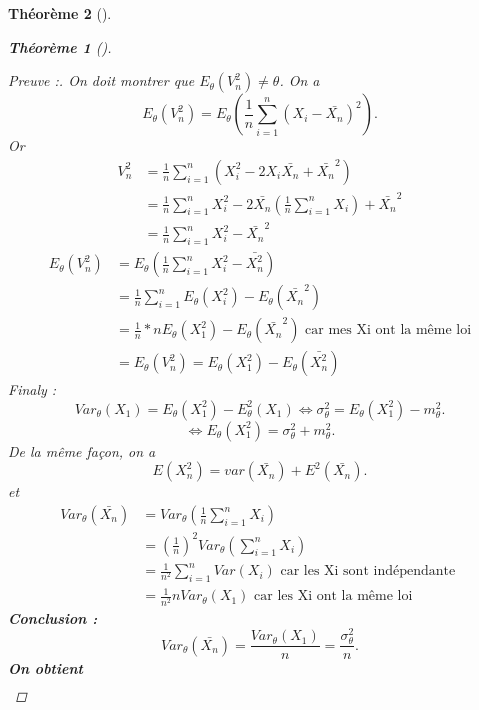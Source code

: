 \documentclass{article}
\theoremstyle{plain}%
\newtheorem{thm}{Théorème}[section]
\theoremstyle{definition}
\theoremstyle{remark}
\begin{document}
\begin{thm}[]
\begin{thm}[]
        \begin{proof}[Preuve :]
            On doit montrer que $ E_\theta (V_n^2) \neq \theta  $. On a 
            \[
                E_\theta(V^2_n) = E_\theta ( \frac{1}{n}\sum_{i=1}^{n} (X_i-\bar{X_n})^2)
            .\]
            Or \begin{align*}
                V_n^2 &= \frac{1}{n}\sum_{i=1}^{n}(X_i^2 -2X_i \bar{X_n} + \bar{X_n} ^2) \\
                &= \frac{1}{n}\sum_{i=1}^{n}X_i^2 - 2 \bar{X_n} (\frac{1}{n}\sum_{i=1}^{n}X_i) + \bar{X_n}^2 \\
                &= \frac{1}{n}\sum_{i=1}^{n}X_i^2 - \bar{X_n}^2
            \end{align*}
            \begin{align*}
                E_\theta (V_n^2) &= E_\theta (\frac{1}{n}\sum_{i=1}^{n}X_i^2 - \bar{X_n^2}) \\
                &= \frac{1}{n}\sum_{i=1}^{n}E_\theta (X_i^2) - E_\theta (\bar{X_n}^2) \\ 
                &= \frac{1}{n} * n E_\theta (X_1^2) - E_\theta (\bar{X_n}^2) \text{ car mes Xi ont la même loi}\\ 
                &= E_\theta (V_n^2) = E_\theta (X_1^2) - E_\theta (\bar{X_n^2})
            \end{align*}
            Finaly : 
            \[
                Var_\theta (X_1) = E_\theta (X_1^2) - E_\theta ^2 (X_1) \Leftrightarrow \sigma _\theta ^2 = E_\theta (X_1^2) - m_\theta ^2
            .\]
            \[
                \Leftrightarrow E_\theta (X_1^2) = \sigma_\theta  ^2 + m_\theta ^2
            .\]
            De la même façon, on a 
            \[
                E(X_n^2) = var(\bar{X_n}) + E^2 (\bar{X_n})
            .\]
            et \begin{align*}
                Var_\theta (\bar{X_n}) &= Var_\theta (\frac{1}{n}\sum_{i=1}^{n} X_i ) \\
                    &= (\frac{1}{n})^2 Var_\theta (\sum_{i=1}^{n}X_i) \\
                    &= \frac{1}{n^2}\sum_{i=1}^{n}Var(X_i) \text{ car les Xi sont indépendante } \\
                    &= \frac{1}{n^2} nVar_\theta (X_1) \text{ car les Xi ont la même loi}
            \end{align*}
            \textbf{Conclusion : }
            \[
                Var_\theta (\bar{X_n}) = \frac{Var_\theta (X_1)}{n} = \frac{\sigma_\theta  ^2}{n}
            .\]
            \textbf{On obtient} \begin{align*}

\end{align*}
\end{proof}
\end{thm}
\end{thm}
\end{document}
